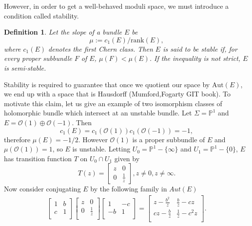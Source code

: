 \documentclass[]{article}
\newtheorem{definition}{Definition}
\newcommand{\OO}{\mathcal{O}}
\begin{document}
	However, in order to get a well-behaved moduli space, we must introduce a condition called stability. 
	\begin{definition}
		Let the \emph{slope} of a bundle $E$ be
		$$\mu := c_1(E)/\text{rank}(E),$$
		where $c_1(E)$ denotes the first Chern class. Then $E$ is said to be \textit{stable} if, for every proper subbundle $F$ of $E$, $\mu(F) < \mu(E)$. If the inequality is not strict, $E$ is \textit{semi-stable}.
	\end{definition}
	Stability is required to guarantee that once we quotient our space by $\text{Aut}(E)$, we end up with a space that is Hausdorff (Mumford,Fogarty GIT book). To motivate this claim, let us give an example of two isomorphism classes of holomorphic bundle which intersect at an unstable bundle. Let $\Sigma = \mathbb{P}^1$ and $E = \OO(1)\oplus \OO(-1)$. Then
	\begin{equation}
		c_1(E) = c_1(\OO(1))c_1(\OO(-1)) = -1,
	\end{equation} 
	therefore $\mu(E) = -1/2$. However $\OO(1)$ is a proper subbundle of $E$ and $\mu(\OO(1)) = 1$, so $E$ is unstable. Letting $U_0 = \mathbb{P}^1 - \{\infty\}$ and $U_1 = \mathbb{P}^1 - \{0\}$, $E$ has transition function $T$ on $U_0 \cap U_1$ given by
	\begin{equation*}
	T(z) = \begin{bmatrix}
	z & 0\\
	0 & \frac{1}{z}
	\end{bmatrix}, z \neq 0, z\neq \infty.
	\end{equation*}
	Now consider conjugating $E$ by the following family in $Aut(E)$
	\begin{align*}
		\begin{bmatrix}
		1 & b\\
		c & 1\\
		\end{bmatrix}
		\begin{bmatrix}
		z & 0\\
		0 & \frac{1}{z}\\
		\end{bmatrix}
		\begin{bmatrix}
		1 & -c\\
		-b & 1\\
		\end{bmatrix} = \begin{bmatrix}
		z - \frac{b^2}{z} & \frac{b}{z}-cz\\
		cz - \frac{b}{z} & \frac{1}{z}-c^2 z\\
		\end{bmatrix}.
	\end{align*}
\end{document}
